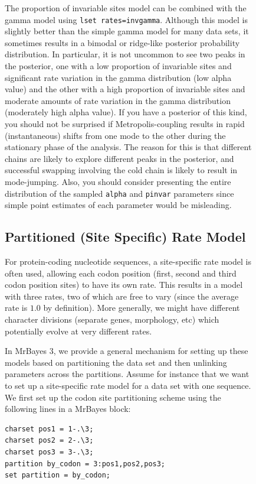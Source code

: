 \documentclass[12pt]{book}
\newcommand{\ttt}[1]{\texttt{#1}}
\begin{document}
\begin{figure}[h]
The proportion of invariable sites model can be combined with the gamma model using \ttt{lset
rates=invgamma}. Although this model is slightly better than the simple gamma model for many data
sets, it sometimes results in a bimodal or ridge-like posterior probability distribution. In
particular, it is not uncommon to see two peaks in the posterior, one with a low proportion of
invariable sites and significant rate variation in the gamma distribution (low alpha value) and the
other with a high proportion of invariable sites and moderate amounts of rate variation in the
gamma distribution (moderately high alpha value). If you have a posterior of this kind, you should
not be surprised if Metropolis-coupling results in rapid (instantaneous) shifts from one mode to
the other during the stationary phase of the analysis. The reason for this is that different chains
are likely to explore different peaks in the posterior, and successful swapping involving the cold
chain is likely to result in mode-jumping. Also, you should consider presenting the entire
distribution of the sampled \ttt{alpha} and \ttt{pinvar} parameters since simple point estimates of
each parameter would be misleading.

\subsection{Partitioned (Site Specific) Rate Model}

For protein-coding nucleotide sequences, a site-specific rate model is often used, allowing each
codon position (first, second and third codon position sites) to have its own rate. This results in
a model with three rates, two of which are free to vary (since the average rate is $1.0$ by
definition). More generally, we might have different character divisions (separate genes,
morphology, etc) which potentially evolve at very different rates.

In MrBayes 3, we provide a general mechanism for setting up these models based on partitioning the
data set and then unlinking parameters across the partitions. Assume for instance that we want to
set up a site-specific rate model for a data set with one sequence. We first set up the codon site
partitioning scheme using the following lines in a MrBayes block:

\begin{singlespacing}
\small
\begin{verbatim}
charset pos1 = 1-.\3;
charset pos2 = 2-.\3;
charset pos3 = 3-.\3;
partition by_codon = 3:pos1,pos2,pos3;
set partition = by_codon;
\end{verbatim}
\normalsize
\end{singlespacing}


\end{figure}
\end{document}
